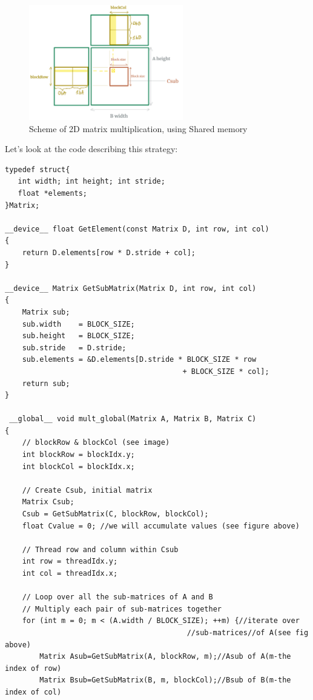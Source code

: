 {\begin{figure}[h!]
   \begin{center}
   \includegraphics[width=0.6\textwidth]{pngs/globalmatrix.png}
   \end{center}
   \vspace{-0.5cm}
   \captionsetup{justification=raggedleft}
   \caption{Scheme of 2D matrix multiplication, using Shared memory}
   \label{global2d}
\end{figure}


Let's look at the code describing this strategy:

\begin{verbatim}
typedef struct{
   int width; int height; int stride;
   float *elements;
}Matrix;

__device__ float GetElement(const Matrix D, int row, int col)
{
    return D.elements[row * D.stride + col];
}

__device__ Matrix GetSubMatrix(Matrix D, int row, int col) 
{
    Matrix sub;
    sub.width    = BLOCK_SIZE;
    sub.height   = BLOCK_SIZE;
    sub.stride   = D.stride;
    sub.elements = &D.elements[D.stride * BLOCK_SIZE * row
                                         + BLOCK_SIZE * col];
    return sub;
}

 __global__ void mult_global(Matrix A, Matrix B, Matrix C)
{
    // blockRow & blockCol (see image)
    int blockRow = blockIdx.y;
    int blockCol = blockIdx.x;

    // Create Csub, initial matrix
    Matrix Csub;
    Csub = GetSubMatrix(C, blockRow, blockCol);
    float Cvalue = 0; //we will accumulate values (see figure above)

    // Thread row and column within Csub
    int row = threadIdx.y;
    int col = threadIdx.x;

    // Loop over all the sub-matrices of A and B 
    // Multiply each pair of sub-matrices together
    for (int m = 0; m < (A.width / BLOCK_SIZE); ++m) {//iterate over 
                                          //sub-matrices//of A(see fig above)  
        Matrix Asub=GetSubMatrix(A, blockRow, m);//Asub of A(m-the index of row)
        Matrix Bsub=GetSubMatrix(B, m, blockCol);//Bsub of B(m-the index of col)


\end{verbatim}}
